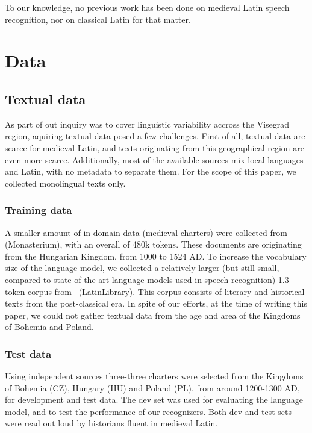 \documentclass[runningheads,a4paper]{llncs}
\begin{document}
To our knowledge, no previous work has been done on medieval Latin speech recognition, nor on classical Latin for that matter.

\section{Data}
\subsection{Textual data}\label{text}
As part of out inquiry was to cover linguistic variability accross the Visegrad region, aquiring textual data posed a few challenges.
First of all, textual data are scarce for medieval Latin, and texts originating from this geographical region are even more scarce.
Additionally, most of the available sources mix local languages and Latin, with no metadata to separate them.
For the scope of this paper, we collected monolingual texts only.
\subsubsection{Training data}\label{traintext}
A smaller amount of in-domain data (medieval charters) were collected from~\cite{monasterium} (Monasterium), with an overall of 480k tokens.
These documents are originating from the Hungarian Kingdom, from 1000 to 1524 AD.
To increase the vocabulary size of the language model, we collected a relatively larger (but still small, compared to state-of-the-art language models used in speech recognition) 1.3 token corpus from~\cite{latinlibrary} (LatinLibrary).
This corpus consists of literary and historical texts from the post-classical era.
In spite of our efforts, at the time of writing this paper, we could not gather textual data from the age and area of the Kingdoms of Bohemia and Poland.
\subsubsection{Test data}\label{testtext}
Using independent sources three-three charters were selected from the Kingdoms of Bohemia (CZ), Hungary (HU) and Poland (PL), from around 1200-1300 AD, for development and test data.
The dev set was used for evaluating the language model, and to test the performance of our recognizers.
Both dev and test sets were read out loud by historians fluent in medieval Latin.
\end{document}
